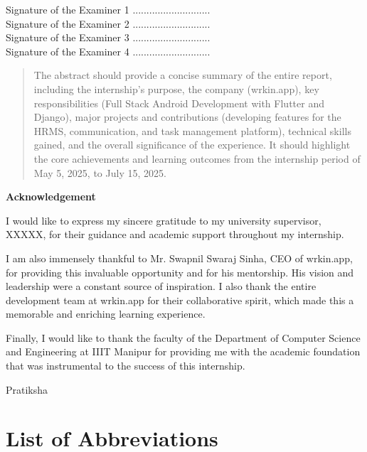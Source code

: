 \documentclass[a4paper, 11pt, oneside]{report}
\newcommand{\listofabbreviations}{\chapter*{List of Abbreviations}\addcontentsline{toc}{chapter}{List of Abbreviations}}
\begin{document}
\vspace{0.5cm}
Signature of the Examiner 1 ............................\\
Signature of the Examiner 2 ............................\\
Signature of the Examiner 3 ............................\\
Signature of the Examiner 4 ............................\\

\newpage

\begin{abstract}
The abstract should provide a concise summary of the entire report, including the internship's purpose, the company (wrkin.app), key responsibilities (Full Stack Android Development with Flutter and Django), major projects and contributions (developing features for the HRMS, communication, and task management platform), technical skills gained, and the overall significance of the experience. It should highlight the core achievements and learning outcomes from the internship period of May 5, 2025, to July 15, 2025.
\end{abstract}

\pagebreak

\begin{center}
  {\LARGE \textbf{Acknowledgement}}
\end{center}
\vspace{2cm}
I would like to express my sincere gratitude to my university supervisor, XXXXX, for their guidance and academic support throughout my internship.

I am also immensely thankful to Mr. Swapnil Swaraj Sinha, CEO of wrkin.app, for providing this invaluable opportunity and for his mentorship. His vision and leadership were a constant source of inspiration. I also thank the entire development team at wrkin.app for their collaborative spirit, which made this a memorable and enriching learning experience.

Finally, I would like to thank the faculty of the Department of Computer Science and Engineering at IIIT Manipur for providing me with the academic foundation that was instrumental to the success of this internship.

\vspace{1cm}
\hspace{7cm}Pratiksha

\tableofcontents
\listoffigures
\listoftables
\listofabbreviations
{}
\end{document}
